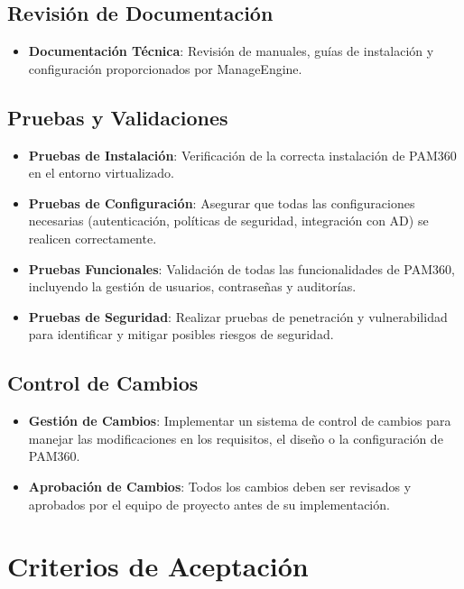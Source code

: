 \subsection{Revisión de Documentación}

\begin{itemize}
	\item \textbf{Documentación Técnica}: Revisión de manuales, guías de instalación y configuración proporcionados por ManageEngine.
\end{itemize}

\subsection{Pruebas y Validaciones}

\begin{itemize}
	\item \textbf{Pruebas de Instalación}: Verificación de la correcta instalación de PAM360 en el entorno virtualizado.
	\item \textbf{Pruebas de Configuración}: Asegurar que todas las configuraciones necesarias (autenticación, políticas de seguridad, integración con AD) se realicen correctamente.
	\item \textbf{Pruebas Funcionales}: Validación de todas las funcionalidades de PAM360, incluyendo la gestión de usuarios, contraseñas y auditorías.
	\item \textbf{Pruebas de Seguridad}: Realizar pruebas de penetración y vulnerabilidad para identificar y mitigar posibles riesgos de seguridad.
\end{itemize}

\subsection{Control de Cambios}

\begin{itemize}
	\item \textbf{Gestión de Cambios}: Implementar un sistema de control de cambios para manejar las modificaciones en los requisitos, el diseño o la configuración de PAM360.
	\item \textbf{Aprobación de Cambios}: Todos los cambios deben ser revisados y aprobados por el equipo de proyecto antes de su implementación.
\end{itemize}

\section{Criterios de Aceptación}

